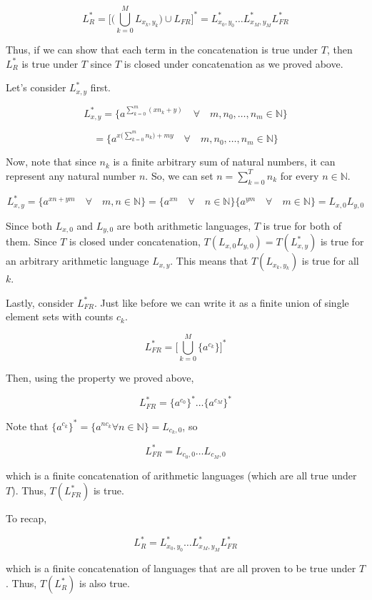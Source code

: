 \documentclass[11pt]{article}
\begin{document}
\begin{enumerate}
    $$ L_R^* = \big[\big(\bigcup_{k=0}^{M} L_{x_k, y_k}\big) \cup L_{FR} \big]^* = L_{x_0, y_0}^* \dots L_{x_M, y_M}^* L_{FR}^*$$

    Thus, if we can show that each term in the concatenation is true under $T$, then $L_R^*$ is true under $T$ since $T$ is closed under concatenation as we proved above.

    Let's consider $L_{x,y}^*$ first.

    $$L_{x,y}^* = \{a^{\sum_{k=0}^m (x n_k + y)} \quad \forall \quad m, n_0,\dots,n_m \in \mathbb{N}\}$$

    $$ = \{a^{x\big( \sum_{k=0}^m n_k \big )+ m y} \quad \forall \quad m, n_0,\dots,n_m \in \mathbb{N}\}$$

    Now, note that since $n_k$ is a finite arbitrary sum of natural numbers, it can represent any natural number $n$. So, we can set $n = \sum_{k=0}^T n_k$ for every $n \in \mathbb{N}$.

    $$ L_{x,y}^* = \{ a^{xn + ym} \quad \forall \quad m, n \in \mathbb{N} \} =  \{ a^{xn} \quad \forall \quad n \in \mathbb{N} \} \{ a^{ym} \quad \forall \quad m \in \mathbb{N} \} = L_{x,0} L_{y, 0}$$

    Since both $L_{x, 0}$ and $L_{y, 0}$ are both arithmetic languages, $T$ is true for both of them. Since $T$ is closed under concatenation, $T(L_{x,0} L_{y, 0}) = T(L_{x, y}^*)$ is true for an arbitrary arithmetic language $L_{x,y}$. This means that $T(L_{x_k, y_k})$ is true for all $k$. 

    Lastly, consider $L_{FR}^*$. Just like before we can write it as a finite union of single element sets with counts $c_k$.

    $$L_{FR}^* = \big[ \bigcup_{k=0}^M \{ a^{c_k} \} \big]^*$$

    Then, using the property we proved above,

    $$L_{FR}^* = \{ a^{c_0} \}^* \dots \{ a^{c_M} \}^*$$

    Note that $\{ a^{c_k} \}^* = \{a^{n c_k} \forall n \in \mathbb{N} \} = L_{c_k, 0}$, so

    $$L_{FR}^* = L_{c_0, 0}\dots L_{c_M, 0}$$

    which is a finite concatenation of arithmetic languages (which are all true under $T$). Thus, $T(L_{FR}^*)$ is true.

    To recap, 

    $$ L_R^* = L_{x_0, y_0}^* \dots L_{x_M, y_M}^* L_{FR}^*$$

    which is a finite concatenation of languages that are all proven to be true under $T$. Thus, $T(L_R^*)$ is also true.


\end{enumerate}
\end{document}
